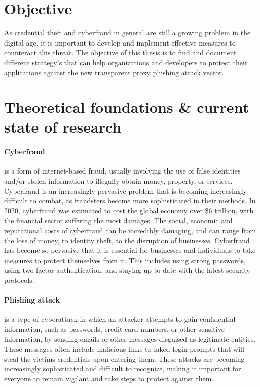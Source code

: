 \documentclass[12pt]{scrbook}
\begin{document}
\section{Objective} As credential theft and cyberfraud in general are still a
growing problem in the digital age, it is important to develop and implement
effective measures to counteract this threat. The objective of this thesis is to
find and document different strategy's that can help organizations and
developers to protect their applications against the new transparent proxy
phishing attack vector.

\section{Theoretical foundations \& current state of research}
\paragraph{Cyberfraud} is a form of internet-based fraud, usually involving the use of false identities
and/or stolen information to illegally obtain money, property, or services.
Cyberfraud is an increasingly pervasive problem that is becoming increasingly
difficult to combat, as fraudsters become more sophisticated in their methods.
In 2020, cyberfraud was estimated to cost the global economy over \$6
trillion\cite{6trillion}, with the financial sector suffering the most damages.
The social, economic and reputational costs of cyberfraud can be incredibly
damaging, and can range from the loss of money, to identity theft, to the
disruption of businesses. Cyberfraud has become so pervasive that it is
essential for businesses and individuals to take measures to protect themselves
from it. This includes using strong passwords, using two-factor authentication,
and staying up to date with the latest security protocols.

\paragraph{Phishing attack} is a type of cyberattack in which an attacker attempts to gain
confidential information, such as passwords, credit card numbers, or other
sensitive information, by sending emails or other messages disguised as
legitimate entities. These messages often include malicious links to faked login
prompts that will steal the victims credentials upon entering them. These
attacks are becoming increasingly sophisticated and difficult to recognize,
making it important for everyone to remain vigilant and take steps to protect
against them.
\end{document}
